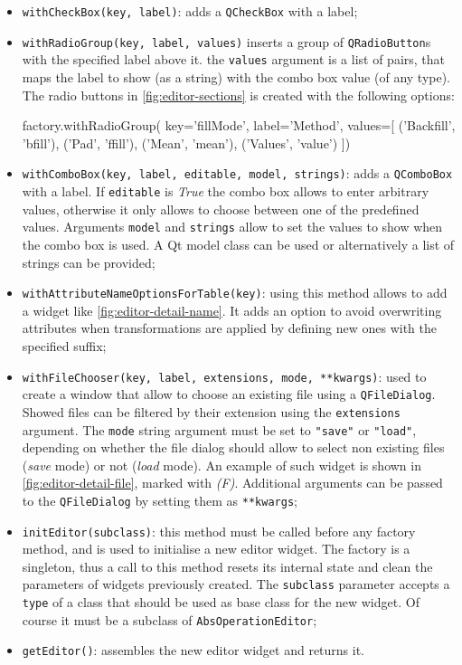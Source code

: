 \begin{itemize}
	\item \texttt{withCheckBox(key, label)}: adds a \texttt{QCheckBox} with a label;
	\item \texttt{withRadioGroup(key, label, values)} inserts a group of \texttt{QRadioButton}s with the specified label above it. the \texttt{values} argument is a list of pairs, that maps the label to show (as a string) with the combo box value (of any type). The radio buttons in \cref{fig:editor-sections} is created with the following options:
	\begin{python}[emph={withRadioGroup}]
		factory.withRadioGroup(
		key='fillMode', 
		label='Method',
		values=[
		('Backfill', 'bfill'),
		('Pad', 'ffill'),
		('Mean', 'mean'),
		('Values', 'value')
		])
	\end{python}
	\item \texttt{withComboBox(key, label, editable, model, strings)}: adds a \texttt{QComboBox} with a label. If \texttt{editable} is \textit{True} the combo box allows to enter arbitrary values, otherwise it only allows to choose between one of the predefined values. Arguments \texttt{model} and \texttt{strings} allow to set the values to show when the combo box is used. A Qt model class can be used or alternatively a list of strings can be provided;
	\item \texttt{withAttributeNameOptionsForTable(key)}: using this method allows to add a widget like \cref{fig:editor-detail-name}. It adds an option to avoid overwriting attributes when transformations are applied by defining new ones with the specified suffix;
	\item \texttt{withFileChooser(key, label, extensions, mode, **kwargs)}: used to create a window that allow to choose an existing file using a \texttt{QFileDialog}. Showed files can be filtered by their extension using the \texttt{extensions} argument. The \texttt{mode} string argument must be set to \texttt{"save"} or \texttt{"load"}, depending on whether the file dialog should allow to select non existing files (\textit{save} mode) or not (\textit{load} mode). An example of such widget is shown in \cref{fig:editor-detail-file}, marked with \textit{(F)}. Additional arguments can be passed to the \texttt{QFileDialog} by setting them as \texttt{**kwargs};
	\item \texttt{initEditor(subclass)}: this method must be called before any factory method, and is used to initialise a new editor widget. The factory is a singleton, thus a call to this method resets its internal state and clean the parameters of widgets previously created. The \texttt{subclass} parameter accepts a \texttt{type} of a class that should be used as base class for the new widget. Of course it must be a subclass of \texttt{AbsOperationEditor};
	\item \texttt{getEditor()}: assembles the new editor widget and returns it.
\end{itemize}

